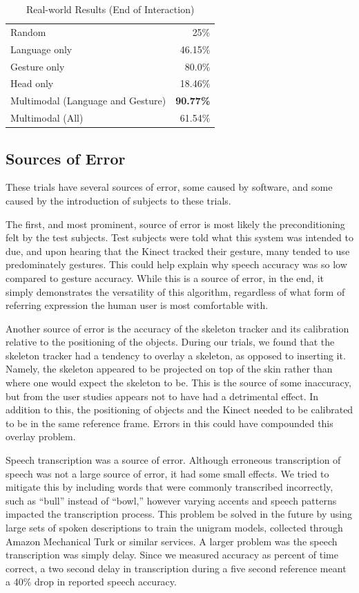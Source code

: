 \documentclass[a4paper, 11pt]{article} %
\begin{document}
\begin{table}
\caption{Real-world Results (End of Interaction)\label{table:end_real}}
\centering
\begin{tabular}{lr}
\toprule
Random & 25\%\\
Language only &  46.15\%\\
Gesture only  &  80.0\%\\
Head only     & 18.46\%\\
Multimodal (Language and Gesture) & {\bf 90.77\%}\\
Multimodal (All) &  61.54\%\\
\bottomrule
\end{tabular}
\end{table}
\subsection{Sources of Error}
These trials have several sources of error, some caused by software, and some caused by the introduction of subjects to these trials.

The first, and most prominent, source of error is most likely the preconditioning felt by the test subjects. Test subjects were told what this system was intended to due, and upon hearing that the Kinect tracked their gesture, many tended to use predominately gestures. This could help explain why speech accuracy was so low compared to gesture accuracy. While this is a source of error, in the end, it simply demonstrates the versatility of this algorithm, regardless of what form of referring expression the human user is most comfortable with.

Another source of error is the accuracy of the skeleton tracker and its calibration relative to the positioning of the objects. During our trials, we found that the skeleton tracker had a tendency to overlay a skeleton, as opposed to inserting it. Namely, the skeleton appeared to be projected on top of the skin rather than where one would expect the skeleton to be. This is the source of some inaccuracy, but from the user studies appears not to have had a detrimental effect. In addition to this, the positioning of objects and the Kinect needed to be calibrated to be in the same reference frame. Errors in this could have compounded this overlay problem.

Speech transcription was a source of error. Although erroneous transcription of speech was not a large source of error, it had some small effects. We tried to mitigate this by including words that were commonly transcribed incorrectly, such as ``bull'' instead of ``bowl,'' however varying accents and speech patterns impacted the transcription process. This problem  be solved in the future by using large sets of spoken descriptions to train the unigram models, collected through Amazon Mechanical Turk or similar services. A larger problem was the speech transcription was simply delay. Since we measured accuracy as percent of time correct, a two second delay in transcription during a five second reference meant a 40\% drop in reported speech accuracy.
\end{document}
